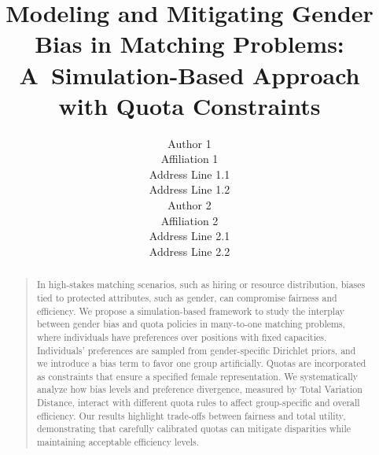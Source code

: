 \documentclass[letterpaper]{article}
\begin{document}
\title{Modeling and Mitigating Gender Bias in Matching Problems: A~Simulation-Based Approach with Quota Constraints}
\author{Author 1\\
Affiliation 1\\
Address Line 1.1\\
Address Line 1.2\\
\And Author 2\\
Affiliation 2\\
Address Line 2.1\\
Address Line 2.2\\
}


\maketitle
\begin{abstract}
\begin{quote}
In high-stakes matching scenarios, such as hiring or resource distribution, biases tied to protected attributes, such as gender, can compromise fairness and efficiency. We propose a simulation-based framework to study the interplay between gender bias and quota policies in many-to-one matching problems, where individuals have preferences over positions with fixed capacities. Individuals' preferences are sampled from gender-specific Dirichlet priors, and we introduce a bias term to favor one group artificially. Quotas are incorporated as constraints that ensure a specified female representation. We systematically analyze how bias levels and preference divergence, measured by Total Variation Distance, interact with different quota rules to affect group-specific and overall efficiency. Our results highlight trade-offs between fairness and total utility, demonstrating that carefully calibrated quotas can mitigate disparities while maintaining acceptable efficiency levels. 
\end{quote}
\end{abstract}
\end{document}
